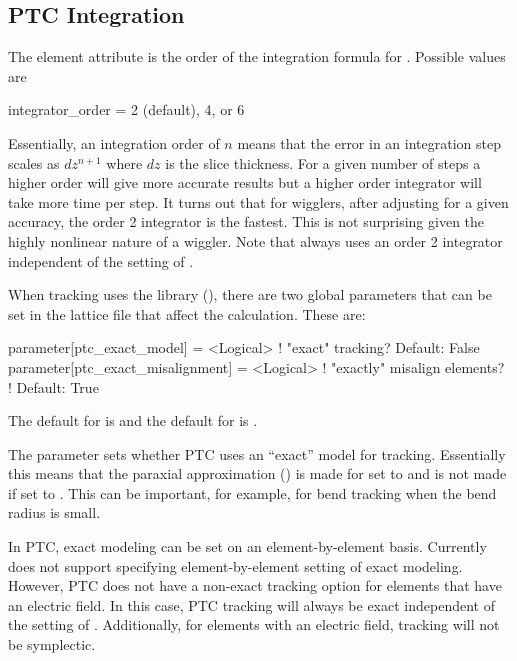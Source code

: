 \subsection{PTC Integration}
\label{s:ptc.integ}

The  element attribute is the order of the integration formula for
. Possible values are
\begin{example}
  integrator_order = 2 (default), 4, or 6
\end{example}
Essentially, an integration order of $n$ means that the error in an integration step scales as
$dz^{n+1}$ where $dz$ is the slice thickness.  For a given number of steps a higher order will give
more accurate results but a higher order integrator will take more time per step. It turns out that
for wigglers, after adjusting  for a given accuracy, the order 2 integrator is the
fastest. This is not surprising given the highly nonlinear nature of a wiggler. Note that
 always uses an order 2 integrator independent of the setting of
.

When tracking uses the  library (), there are two global parameters that
can be set in the lattice file that affect the calculation. These are:
\begin{example}
  parameter[ptc_exact_model]        = <Logical>  ! "exact" tracking? Default: False
  parameter[ptc_exact_misalignment] = <Logical>  ! "exactly" misalign elements? 
                                                 !    Default: True
\end{example}
The default for  is  and the default for
 is . 

The  parameter sets whether PTC uses an ``exact'' model for
tracking. Essentially this means that the paraxial approximation () is made
for  set to  and is not made if set to . This can be
important, for example, for bend tracking when the bend radius is small.

In PTC, exact modeling can be set on an element-by-element basis. Currently \bmad does not support
specifying element-by-element setting of exact modeling. However, PTC does not have a non-exact
tracking option for elements that have an electric field. In this case, PTC tracking will always be
exact independent of the setting of .  Additionally, for elements with an
electric field, tracking will not be symplectic.

